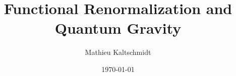 \title{Functional Renormalization and Quantum Gravity}
\author{Mathieu Kaltschmidt}
\date{\today}

\newtheorem{statements}{Statements}[chapter]

\usepackage{fancyhdr}
\fancyhfoffset{0pt}

\usepackage[a4paper,
			width = 150mm,
			top = 30mm,
		    bottom=30mm%
		    ]{geometry}
\usepackage[onehalfspacing]{setspace}


\def\blankpage{%
	\clearpage%
	\thispagestyle{empty}
	\addtocounter{page}{-1}
	\null%
	\clearpage}

\renewcommand{\chaptermark}[1]{
    \markboth{\mbox{\@chapapp}\ \thechapter.\ \ #1}{}%
}
\renewcommand{\sectionmark}[1]{
    \markright{\thesection\ \ #1}{}
}

\renewcommand*\raggedchapter{\centering}
\renewcommand*{\chapterformat}{%
  \chapappifchapterprefix{\nobreakspace}\thechapter\autodot%
  \IfUsePrefixLine{%
    \par\nobreak\vspace{-\parskip}\vspace{-.6\baselineskip}%
    \rule{0.9\textwidth}{0.5pt}\vspace{-1\baselineskip}%
  }{\enskip}%
}
\renewcommand\chapterlineswithprefixformat[3]{%
#2#3
}



\pagestyle{fancy}
	\fancyhf{}
	\fancyhead[LE]{\footnotesize\nouppercase{\leftmark}}
	\fancyhead[RO]{\footnotesize\nouppercase{\rightmark}}
	\fancyfoot[C]{-\thepage-}
	\renewcommand{\headrulewidth}{0.2pt}
	\renewcommand{\footrulewidth}{0pt}



\usepackage{amsmath, amssymb, commath, mathtools}
\usepackage{physics}
\usepackage[hyperref]{ntheorem}
\usepackage{xfrac}
\usepackage[separate-uncertainty]{siunitx}


